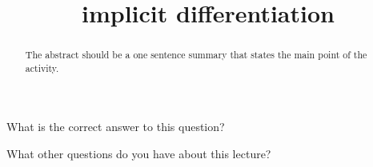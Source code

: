 \documentclass{ximera}
\title{implicit differentiation}
\begin{document}
\begin{abstract}
  The abstract should be a one sentence summary that states the main point of the activity.
\end{abstract}

\maketitle

\begin{question}
  What is the correct answer to this question?

  \begin{solution}
    \begin{multiple-choice}
    \end{multiple-choice}  
  \end{solution}
\end{question}

What other questions do you have about this lecture?
\begin{free-response}
\end{free-response}
\end{document}

